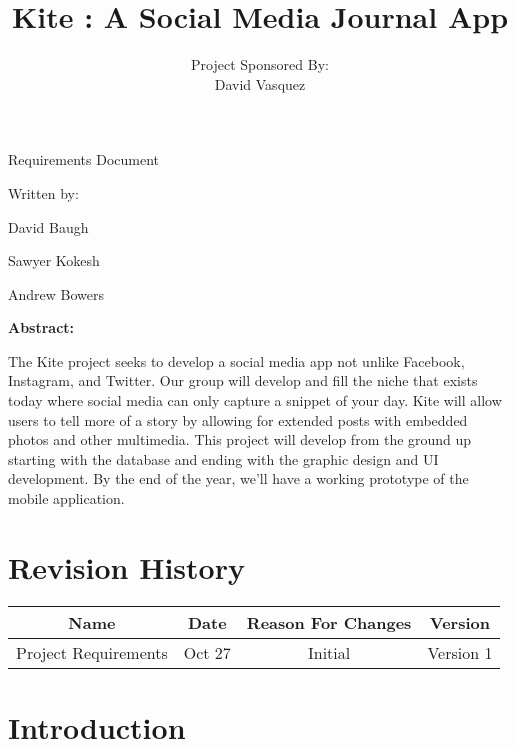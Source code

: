 \documentclass[letterpaper, 10, draftclsnofoot, onecolumn]{IEEEtran}
\date{}
\title{Kite : A Social Media Journal App}
\author{ %
	Project Sponsored By: \\
    David Vasquez
}
\begin{document}
\null  %
\nointerlineskip  %
\vfill
\let\snewpage \newpage
\let\newpage \relax
\maketitle
\begin{center}
\huge{Requirements Document}\par
\vspace{2mm}
\large{Written by:}\par
\normalsize{David Baugh}\par
\normalsize{Sawyer Kokesh}\par
\normalsize{Andrew Bowers}\par
\vspace{8mm}
\large{\textbf{Abstract:}}\par 
\vspace{2mm}
\normalsize{The Kite project seeks to develop a social media 
app not unlike Facebook, Instagram, and Twitter. Our group will develop and fill the 
niche that exists today where social media can only capture a snippet of your day. 
Kite will allow users to tell more of a story by allowing for extended posts with embedded photos and other multimedia. 
This project will develop from the ground up starting with the database and ending
 with the graphic design and UI development. By the end of the year, we'll have a working prototype of the mobile application.}
\end{center}
\let \newpage \snewpage
\vfill 
\break %

\tableofcontents


\section*{Revision History}

\begin{center}
    \begin{tabular}{|c|c|c|c|}
        \hline
	    Name & Date & Reason For Changes & Version\\
        \hline
	    Project Requirements & Oct 27 & Initial & Version 1\\
        \hline
    \end{tabular}
\end{center}

\section{Introduction}
\end{document}
